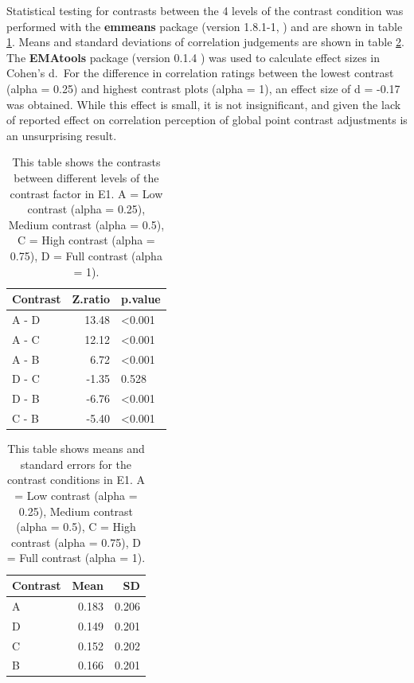 \documentclass[preprint, 3p,
authoryear]{elsarticle} %
\begin{document}
Statistical testing for contrasts between the 4 levels of the contrast
condition was performed with the \textbf{emmeans} package (version
1.8.1-1, \citep{emmeans}) and are shown in table
\ref{contrasts-table-e1}. Means and standard deviations of correlation
judgements are shown in table \ref{sum-stats-e1}. The \textbf{EMAtools}
package (version 0.1.4 \citep{ematools}) was used to calculate effect
sizes in Cohen's d.~For the difference in correlation ratings between
the lowest contrast (alpha = 0.25) and highest contrast plots (alpha =
1), an effect size of d = -0.17 was obtained. While this effect is
small, it is not insignificant, and given the lack of reported effect on
correlation perception of global point contrast adjustments
\citep{rensink_2012} is an unsurprising result.

\begin{table}

\caption{\label{tab:contrasts-table-e1}\label{contrasts-table-e1}This table shows the contrasts between different levels of the contrast factor in E1. A = Low contrast (alpha = 0.25), Medium contrast (alpha = 0.5), C = High contrast (alpha = 0.75), D = Full contrast (alpha = 1).}
\centering
\begin{tabular}[t]{lrl}
\toprule
Contrast & Z.ratio & p.value\\
\midrule
A - D & 13.48 & <0.001\\
A - C & 12.12 & <0.001\\
A - B & 6.72 & <0.001\\
D - C & -1.35 & 0.528\\
D - B & -6.76 & <0.001\\
\addlinespace
C - B & -5.40 & <0.001\\
\bottomrule
\end{tabular}
\end{table}

\begin{table}

\caption{\label{tab:sum-stats-e1}\label{sum-stats-e1}This table shows means and standard errors for the contrast conditions in E1. A = Low contrast (alpha = 0.25), Medium contrast (alpha = 0.5), C = High contrast (alpha = 0.75), D = Full contrast (alpha = 1).}
\centering
\begin{tabular}[t]{lrr}
\toprule
Contrast & Mean & SD\\
\midrule
A & 0.183 & 0.206\\
D & 0.149 & 0.201\\
C & 0.152 & 0.202\\
B & 0.166 & 0.201\\
\bottomrule
\end{tabular}
\end{table}
\end{document}
